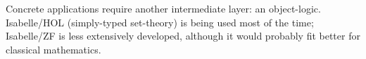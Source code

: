 \begin{isabellebody}
\begin{isamarkuptext}
  Concrete applications require another intermediate layer: an
  object-logic.  Isabelle/HOL \cite{isa-tutorial} (simply-typed
  set-theory) is being used most of the time; Isabelle/ZF
  \cite{isabelle-ZF} is less extensively developed, although it would
  probably fit better for classical mathematics.%
\end{isamarkuptext}%
\isamarkuptrue%
%
\isadelimtheory
%
\endisadelimtheory
%
\isatagtheory
{}\isamarkupfalse%
%
\endisatagtheory
{\isafoldtheory}%
%
\isadelimtheory
%
\endisadelimtheory
\isanewline
\end{isabellebody}%
